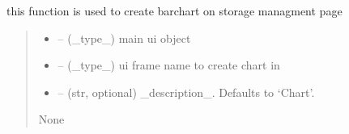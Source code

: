 \documentclass[letterpaper,10pt,english]{sphinxmanual}
\begin{document}
\begin{savenotes}\begin{fulllineitems}
\label{\detokenize{setting/backend/chart_funcs:oxin.backend.chart_funcs.create_drive_barchart_on_ui}}
\pysigstartsignatures
{}
\pysigstopsignatures
\sphinxAtStartPar
this function is used to create bar\sphinxhyphen{}chart on storage managment page
\begin{quote}\begin{description}
\begin{itemize}
\item {} 
\sphinxAtStartPar
{} – (\_type\_) main ui object

\item {} 
\sphinxAtStartPar
{} – (\_type\_) ui frame name to create chart in

\item {} 
\sphinxAtStartPar
{} – (str, optional) \_description\_. Defaults to ‘Chart’.

\end{itemize}

\sphinxAtStartPar
None

\end{description}\end{quote}

\end{fulllineitems}\end{savenotes}

\end{document}
